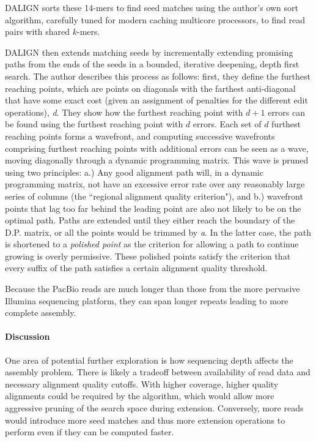DALIGN sorts these 14-mers to find seed matches using the author's own sort algorithm, carefully tuned for modern caching multicore processors, to find read pairs with shared $k$-mers.

DALIGN then extends matching seeds by incrementally extending promising paths from the ends of the seeds in a bounded, iterative deepening, depth first search.
The author describes this process as follows: first, they define the furthest reaching points, which are points on diagonals with the farthest anti-diagonal that have some exact cost (given an assignment of penalties for the different edit operations), \emph{d}.
They show how the furthest reaching point with  $d+1$ errors can be found using the furthest reaching point with $d$ errors.
Each set of $d$ furthest reaching points forms a wavefront, and computing successive wavefronts comprising furthest reaching points with additional errors can be seen as a wave, moving diagonally through a dynamic programming matrix.
This wave is pruned using two principles: a.) Any good alignment path will, in a dynamic programming matrix,  not have an excessive error rate over any reasonably large series of columns (the ``regional alignment quality criterion"), and b.) wavefront points that lag too far behind the leading point are also not likely to be on the optimal path.
Paths are extended until they either reach the boundary of the D.P. matrix, or all the points would be trimmed by \emph{a}.
In the latter case, the path is shortened to a \emph{polished point} as the criterion for allowing a path to continue growing is overly permissive.
These polished points satisfy the criterion that every suffix of the path satisfies a certain alignment quality threshold.  %

Because the PacBio reads are much longer than those from the more pervasive Illumina sequencing platform, they can span longer repeats leading to more complete assembly.

\paragraph{Discussion}

One area of potential further exploration is how sequencing depth affects the assembly problem.  There is likely a tradeoff between availability of read data and necessary alignment quality cutoffs.  With higher coverage, higher quality alignments could be required by the algorithm, which would allow more aggressive pruning of the search space during extension.  Conversely, more reads would introduce more seed matches and thus more extension operations to perform even if they can be computed faster.  


